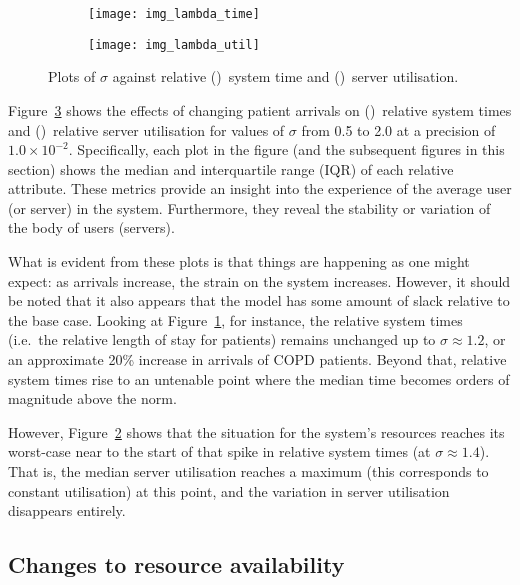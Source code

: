 \documentclass[11pt]{article}
\newlength{\imgwidth}
\begin{document}
\begin{figure}
    \centering
    \begin{subfigure}{.5\imgwidth}
        \texttt{[image: img\_lambda\_time]}
        \caption{}\label{fig:lambda_time}
    \end{subfigure}\hfill%
    \begin{subfigure}{.5\imgwidth}
        \texttt{[image: img\_lambda\_util]}
        \caption{}\label{fig:lambda_util}
    \end{subfigure}
    \caption{%
        Plots of \(\sigma\) against relative ()~system
        time and ()~server utilisation.
    }\label{fig:lambda}
\end{figure}

Figure~\ref{fig:lambda} shows the effects of changing patient arrivals on
()~relative system times and
()~relative server utilisation for values of \(\sigma\)
from 0.5 to 2.0 at a precision of \(1.0 \times 10^{-2}\). Specifically, each
plot in the figure (and the subsequent figures in this section) shows the median
and interquartile range (IQR) of each relative attribute. These metrics provide
an insight into the experience of the average user (or server) in the system.
Furthermore, they reveal the stability or variation of the body of users
(servers).

What is evident from these plots is that things are happening as one might
expect: as arrivals increase, the strain on the system increases. However, it
should be noted that it also appears that the model has some amount of slack
relative to the base case. Looking at Figure~\ref{fig:lambda_time}, for
instance, the relative system times (i.e.\ the relative length of stay for
patients) remains unchanged up to \(\sigma \approx 1.2\), or an approximate 20\%
increase in arrivals of COPD patients. Beyond that, relative system times rise
to an untenable point where the median time becomes orders of magnitude above
the norm.

However, Figure~\ref{fig:lambda_util} shows that the situation for the system's
resources reaches its worst-case near to the start of that spike in relative
system times (at \(\sigma \approx 1.4\)). That is, the median server utilisation
reaches a maximum (this corresponds to constant utilisation) at this point, and
the variation in server utilisation disappears entirely.


\subsection{Changes to resource availability}\label{subsec:resources}
\end{document}
